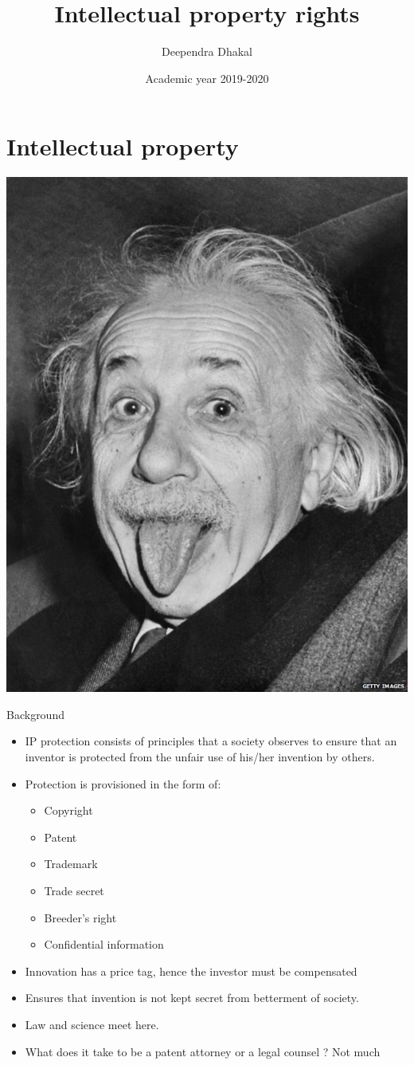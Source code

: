 \documentclass[ignorenonframetext,aspectratio=169]{beamer}
\title{Intellectual property rights}
\author{Deependra Dhakal}
\institute{GAASC, Baitadi \and Tribhuwan University}
\date{Academic year 2019-2020}
\providecommand{\tightlist}{%
  \setlength{\itemsep}{0pt}\setlength{\parskip}{0pt}}
\begin{document}
\frame{\titlepage}

\begin{frame}
\tableofcontents[hideallsubsections]
\end{frame}
\hypertarget{intellectual-property}{%
\section{Intellectual property}\label{intellectual-property}}

\includegraphics[width=0.45\linewidth]{../images/einstein_ipr}

\begin{frame}{Background}
\protect\hypertarget{background}{}

\begin{itemize}
\tightlist
\item
  IP protection consists of principles that a society observes to ensure
  that an inventor is protected from the unfair use of his/her invention
  by others.
\item
  Protection is provisioned in the form of:

  \begin{itemize}
  \tightlist
  \item
    Copyright
  \item
    Patent
  \item
    Trademark
  \item
    Trade secret
  \item
    Breeder's right
  \item
    Confidential information
  \end{itemize}
\item
  Innovation has a price tag, hence the investor must be compensated
\item
  Ensures that invention is not kept secret from betterment of society.
\item
  Law and science meet here.
\item
  What does it take to be a patent attorney or a legal counsel ? Not
  much
\end{itemize}

\end{frame}
\end{document}
